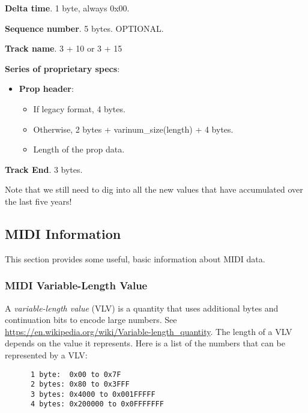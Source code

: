    \begin{enumber}
      \item \textbf{Delta time}.  1 byte, always 0x00.
      \item \textbf{Sequence number}.  5 bytes.  OPTIONAL.
      \item \textbf{Track name}. 3 + 10 or 3 + 15
      \item \textbf{Series of proprietary specs}:
      \begin{itemize}
         \item \textbf{Prop header}:
         \begin{itemize}
            \item If legacy format, 4 bytes.
            \item Otherwise, 2 bytes + varinum\_size(length) + 4 bytes.
            \item Length of the prop data.
         \end{itemize}
      \end{itemize}
      \item \textbf{Track End}. 3 bytes.
   \end{enumber}

   Note that we still need to dig into all the new values that have accumulated
   over the last five years!

\subsection{MIDI Information}
\label{subsec:midi_information}

   This section provides some useful, basic information about MIDI data.

\subsubsection{MIDI Variable-Length Value}
\label{subsubsec:midi_variable_length_value}

   A \textsl{variable-length value} (VLV) is a quantity that uses additional
   bytes and continuation bits to encode large numbers.
   See \url{https://en.wikipedia.org/wiki/Variable-length\_quantity}.
   The length of a VLV depends on the value it represents.
   Here is a list of the numbers that can be represented by a VLV:

   \begin{verbatim}
      1 byte:  0x00 to 0x7F
      2 bytes: 0x80 to 0x3FFF
      3 bytes: 0x4000 to 0x001FFFFF
      4 bytes: 0x200000 to 0x0FFFFFFF
   \end{verbatim}

